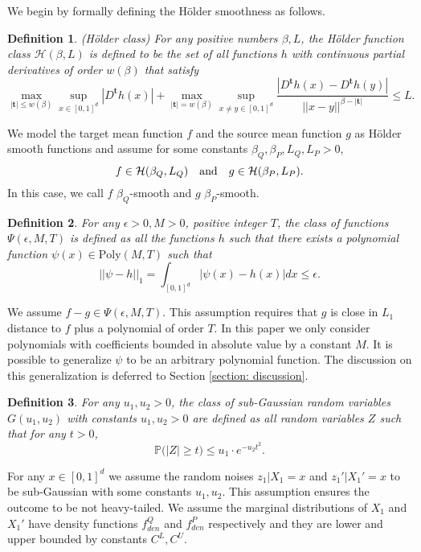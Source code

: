 \documentclass{article}
\def\holder{H\"{o}lder }
\def\H{\mathcal{H}}
\def\P{\mathbb{P}}
\def\t{\textbf{t}}
\newtheorem{definition}{Definition}
\begin{document}
We begin by formally defining the \holder smoothness as follows.
\begin{definition}(\holder class)
For any positive numbers $\beta,L$, the \holder function class $\H(\beta,L)$  is defined to be the set of all  functions $h$ with continuous partial derivatives of order  $w(\beta)$ that satisfy
$$\max_{|\t|\leq w(\beta)}\sup_{x\in [0,1]^d}|D^{\t}h(x)|+\max_{|\t|=w(\beta)}\sup_{x\neq y\in [0,1]^d}\frac{|D^{\t}h(x)-D^{\t}h(y)|}{||x-y||^{\beta-|\t|}}\leq L.$$
\end{definition}

We model the target mean function $f$ and the source mean function $g$ as \holder smooth functions and assume for some  constants $\beta_Q,\beta_P,L_Q,L_P>0$, 
$$f\in \H(\beta_Q,L_Q) \quad {\rm and} \quad g\in \H(\beta_P,L_P).$$
In this case, we call $f$ $\beta_Q$-smooth and $g$ $\beta_P$-smooth.
 
\begin{definition}
For any $\epsilon>0,M>0$, positive integer  $T$, the class of functions $\Psi(\epsilon,M,T)$ is defined as all the functions $h$  such that  there exists a polynomial function $\psi(x)\in \text{Poly}(M, T)$  such that 
$$||\psi-h||_1= \int_{[0,1]^d} |\psi(x)-h(x)| dx \leq \epsilon.$$
\end{definition}
We assume $f-g\in \Psi(\epsilon,M,T)$. This assumption requires that $g$ is close in $L_1$ distance to $f$ plus a polynomial of order $T$. In this paper we only consider  polynomials with coefficients  bounded in absolute value by a constant $M$. It is possible to generalize $\psi$ to be an arbitrary polynomial function. The discussion on this generalization is deferred to Section \ref{section: discussion}.

\begin{definition}
For any $u_1,u_2>0$, the class of sub-Gaussian random variables $G(u_1,u_2)$ with constants $u_1,u_2>0$ are defined as all random variables $Z$ such that for any $t>0$,
$$\P\Big(|Z|\geq t\Big)\leq u_1 \cdot e^{-u_2 t^2}.$$
\end{definition}
For any $x\in [0,1]^d$ we assume the random noises $z_1|X_1=x$ and $z_1'|X_1'=x$ to be sub-Gaussian with some constants $u_1,u_2$. This assumption  ensures the outcome to be not heavy-tailed. We assume the marginal distributions of $X_1$ and $X_1'$ have density functions $f_{den}^Q$ and $f_{den}^P$ respectively and they are  lower and upper bounded by constants $C^L,C^U$.
\end{document}
